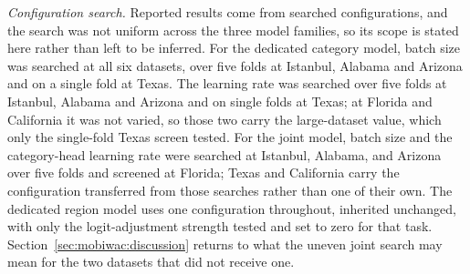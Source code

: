 \emph{Configuration search.} Reported results come from searched configurations, and the search
was not uniform across the three model families, so its scope is stated here rather than left to
be inferred.
For the dedicated category model, batch size was searched at all six datasets, over five folds at
Istanbul, Alabama and Arizona and on a single fold at Texas. The learning rate was
searched over five folds at Istanbul, Alabama and Arizona and on single folds at Texas; at Florida
and California it was not varied, so those two carry the large-dataset value, which only the
single-fold Texas screen tested. For
the joint model, batch size and the category-head learning rate were searched at Istanbul, Alabama,
and Arizona over five folds and screened at Florida; Texas and California carry the configuration
transferred from those searches rather than one of their own. The dedicated region model uses one
configuration throughout, inherited unchanged, with only the logit-adjustment strength tested and
set to zero for that task. Section~\ref{sec:mobiwac:discussion} returns to what the uneven joint
search may mean for the two datasets that did not receive one.


